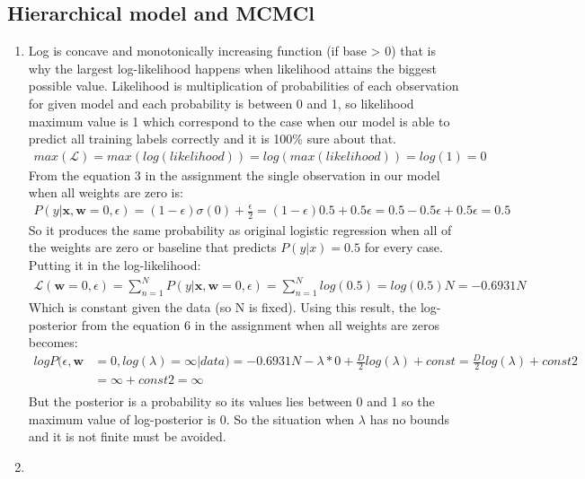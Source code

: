 \documentclass{article}
\newcommand{\vect}[1]{\boldsymbol{#1}} %
\begin{document}
				\subsection{Hierarchical model and MCMCl}
					\begin{enumerate}[label=(\alph*)]
						\item 
							Log is concave and monotonically increasing function (if base > 0) that is why the largest log-likelihood happens when likelihood attains the biggest possible value. Likelihood is multiplication of probabilities of each observation for given model and each probability is between 0 and 1, so likelihood maximum value is 1 which correspond to the case when our model is able to predict all training labels correctly and it is 100\% sure about that.  
							\begin{align*}
							max(\mathcal{L})=max(log(likelihood)) = log(max(likelihood))=log(1)=0
							\end{align*}
							From the equation 3 in the assignment the single observation in our model  when all weights are zero is:
							\begin{align*}
							P(y| \vect{x}, \vect{w}=0, \epsilon) = (1 - \epsilon) \sigma(0) + \frac{\epsilon}{2}=(1-\epsilon)0.5 + 0.5\epsilon = 0.5 - 0.5\epsilon + 0.5\epsilon = 0.5
							\end{align*}
							So it produces the same probability as original logistic regression when all of the weights are zero or baseline that predicts $P(y | x) =0.5$ for every case. Putting it in the log-likelihood:
							\begin{align*}
							\mathcal{L}(\vect{w}=0, \epsilon)=\sum_{n=1}^{N}P(y| \vect{x}, \vect{w}=0, \epsilon)=\sum_{n=1}^{N}log(0.5)=log(0.5)N = -0.6931N
							\end{align*}
							Which is constant given the data (so N is fixed).
							Using this result, the log-posterior from the equation 6 in the assignment when all weights are zeros becomes:
							\begin{align*}
							logP(\epsilon, \vect{w} &=0, log( \lambda)=\infty | data) = -0.6931N - \lambda * 0 + \frac{D}{2}log(\lambda) + const =  \frac{D}{2}log(\lambda) + const2 \\
							&= \infty + const2 = \infty \\
							\end{align*}
							But the posterior is a probability so its values lies between 0 and 1 so the maximum value of log-posterior is 0. So the situation when $\lambda$ has no bounds and it is not finite must be avoided.
						\item 
						

\end{enumerate}
\end{document}
